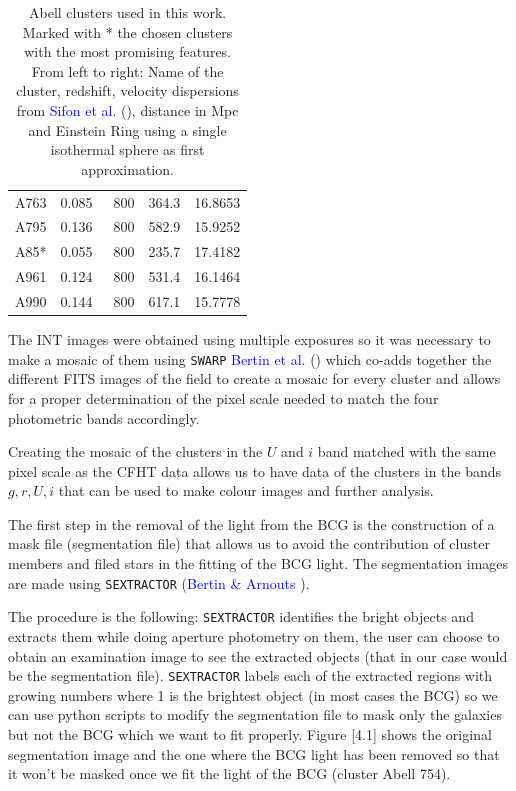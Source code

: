 \begin{table}[H]
\begin{tabular}{ccccc}
A763    & 0.085 & ~800           & 364.3 & 16.8653   \\
A795    & 0.136 & ~800           & 582.9 & 15.9252   \\
A85*    & 0.055 & ~800           & 235.7 & 17.4182   \\
A961    & 0.124 & ~800           & 531.4 & 16.1464   \\
A990    & 0.144 & ~800           & 617.1 & 15.7778   
\end{tabular}
\caption[Abell Clusters and their redshift]{Abell clusters used in this work. Marked with * the chosen clusters with the most promising features. From left to right: Name of the cluster, redshift, velocity dispersions from \textcolor{blue}{Sifon et al.} (\citeyear{Reference6}), distance in Mpc and Einstein Ring using a single isothermal sphere as first approximation.}
\end{table}

The INT images were obtained using multiple exposures so it was necessary to make a mosaic of them using \texttt{SWARP} \textcolor{blue}{Bertin et al.} (\citeyear{Reference29}) which co-adds together the different FITS images of the field to create a mosaic for every cluster and allows for a proper determination of the pixel scale needed to match the four photometric bands accordingly. 

Creating the mosaic of the clusters in the $U$ and $i$ band matched with the same pixel scale as the CFHT data allows us to have data of the clusters in the bands $g,r,U,i$ that can be used to make colour images and further analysis.

 The first step in the removal of the light from the BCG is the construction of a mask file (segmentation file) that allows us to avoid the contribution of cluster members and filed stars in the fitting of the BCG light. The segmentation images are made using \texttt{SEXTRACTOR} (\textcolor{blue}{Bertin \& Arnouts} \citeyear{Reference27}). 

The procedure is the following: \texttt{SEXTRACTOR} identifies the bright objects and extracts them while doing aperture photometry on them, the user can choose to obtain an examination image to see the extracted objects (that in our case would be the segmentation file). \texttt{SEXTRACTOR} labels each of the extracted regions with growing numbers where 1 is the brightest object (in most cases the BCG) so we can use python scripts to modify the segmentation file to mask only the galaxies but not the BCG which we want to fit properly. Figure [4.1] shows the original segmentation image and the one where the BCG light has been removed so that it won't be masked once we fit the light of the BCG (cluster Abell 754). 

